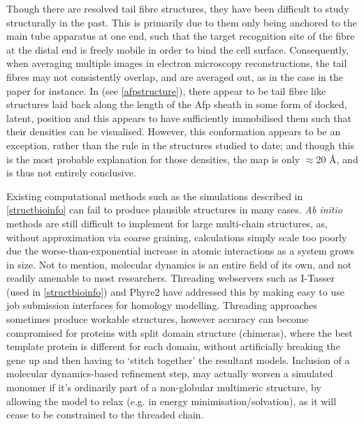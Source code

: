 Though there are resolved tail fibre structures, they have been difficult to study structurally in the past. This is primarily due to them only being anchored to the main tube apparatus at one end, such that the target recognition site of the fibre at the distal end is freely mobile in order to bind the cell surface. Consequently, when averaging multiple images in electron microscopy reconstructions, the tail fibres may not consistently overlap, and are averaged out, as in the case in the \cite{Ge2015} paper for instance. In \cite{Heymann2013} (see \vref{afpstructure}), there appear to be tail fibre like structures laid back along the length of the Afp sheath in some form of docked, latent, position and this appears to have sufficiently immobilised them such that their densities can be visualised. However, this conformation appears to be an exception, rather than the rule in the structures studied to date; and though this is the most probable explanation for those densities, the map is only $\approx$20 \AA, and is thus not entirely conclusive.

Existing computational methods such as the simulations described in \vref{structbioinfo} can fail to produce plausible structures in many cases. \emph{Ab initio} methods are still difficult to implement for large multi-chain structures, as, without approximation via coarse graining, calculations simply scale too poorly due the worse-than-exponential increase in atomic interactions as a system grows in size. Not to mention, molecular dynamics is an entire field of its own, and not readily amenable to most researchers. Threading webservers such as I-Tasser \citep{Yang2014, Zhang2008, Roy2010} (used in \vref{structbioinfo}) and Phyre2 \citep{Kelly2015} have addressed this by making easy to use job submission interfaces for homology modelling. Threading approaches sometimes produce workable structures, however accuracy can become compromised for proteins with split domain structure (chimeras), where the best template protein is different for each domain, without artificially breaking the gene up and then having to `stitch together' the resultant models. Inclusion of a molecular dynamics-based refinement step, may actually worsen a simulated monomer if it's ordinarily part of a non-globular multimeric structure, by allowing the model to relax (e.g. in energy minimisation/solvation), as it will cease to be constrained to the threaded chain.

